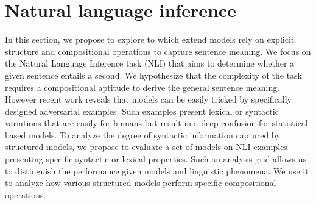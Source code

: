 

\section{Natural language inference}



In this section, we propose to explore to which extend models rely on explicit structure and compositional operations to capture sentence meaning. We focus on the Natural Language Inference task (NLI) that aims to determine whether a given sentence entails a second. We hypothesize that the complexity of the task requires a compositional aptitude to derive the general sentence meaning. However recent work reveals that models can be easily tricked by specifically designed adversarial examples. Such examples present lexical or syntactic variations that are easily  for humans but result in a deep confusion for statistical-based models. 
To analyze the degree of syntactic information captured by structured models, we propose to evaluate a set of models on NLI examples presenting specific syntactic or lexical properties. Such an analysis grid allows us to distinguish the performance given models and linguistic phenomena. We use it to analyze how various structured models perform specific compositional operations.

